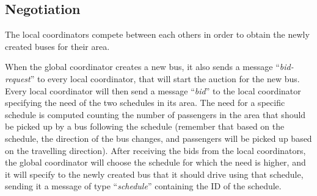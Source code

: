\documentclass{article}
\begin{document}

\subsection{Negotiation}
\label{subsec:negotiations}
The local coordinators compete between each others in order to obtain the newly created buses for their area.

When the global coordinator creates a new bus, it also sends a message ``\textit{bid-request}'' to every local coordinator, that will start the auction for the new bus. Every local coordinator will then send a message ``\textit{bid}'' to the local coordinator specifying the need of the two schedules in its area. The need for a specific schedule is computed counting the number of passengers in the area that should be picked up by a bus following the schedule (remember that based on the schedule, the direction of the bus changes, and passengers will be picked up based on the travelling direction). After receiving the bids from the local coordinators, the global coordinator will choose the schedule for which the need is higher, and it will specify to the newly created bus that it should drive using that schedule, sending it a message of type ``\textit{schedule}'' containing the ID of the schedule.
\end{document}
